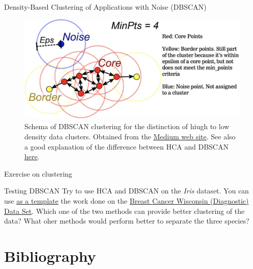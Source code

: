 \documentclass{beamer}
\begin{document}
\begin{frame}{Density-Based Clustering of Applications with Noise (DBSCAN)}
    \begin{figure}
        \includegraphics[width=0.7\linewidth]{DBSCAN}
        \caption{Schema of DBSCAN clustering for the distinction of hiugh to low density data clusters. Obtained from the \href{https://elutins.medium.com/dbscan-what-is-it-when-to-use-it-how-to-use-it-8bd506293818}{Medium web site}. See also a good explanation of the difference between HCA and DBSCAN \href{https://ryanwingate.com/intro-to-machine-learning/unsupervised/hierarchical-and-density-based-clustering/}{here}.}
    \end{figure}
\end{frame}


\begin{frame}{Exercise on clustering}
    \begin{Exercise}{Testing DBSCAN}
        Try to use HCA and DBSCAN on the {\em Iris} dataset. You can use \href{https://www.kaggle.com/code/raphaelekete/cluster-analysis-of-breast-cancer-data-set/notebook}{as a template} the work done on the \href{https://archive.ics.uci.edu/dataset/17/breast+cancer+wisconsin+diagnostic}{Breast Cancer Wisconsin (Diagnostic) Data Set}. 
        Which one of the two methods can provide better clustering of the data? What oher methods would perform better to separate the three species?
    \end{Exercise}
\end{frame}


\section{Bibliography}


\end{document}
